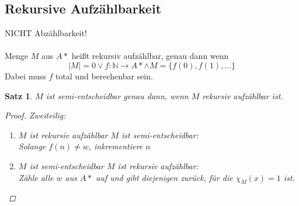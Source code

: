 \documentclass{article}
\begin{document}
\subsection{Rekursive Aufzählbarkeit}
\Rightarrow NICHT Abzählbarkeit!\\\\
Menge $M$ aus $A*$ heißt rekursiv aufzählbar, genau dann wenn
\begin{equation}
    |M|=0 \vee f:\mathbb{N}\rightarrow A* \wedge M=\{f(0), f(1),...\}
\end{equation}
Dabei muss $f$ total und berechenbar sein.\\
\newtheorem{RaSe}{Satz}
\begin{framed}
    \begin{RaSe}
        $M$ ist semi-entscheidbar genau dann, wenn $M$ rekursiv aufzählbar ist.
        \begin{proof}
            Zweiteilig:
            \begin{enumerate}
                \item $M$ ist rekursiv aufzählbar \Rightarrow $M$ ist semi-entscheidbar:\\
                      Solange $f(n) \not= w$, inkrementiere $n$
                \item $M$ ist semi-entscheidbar \Rightarrow $M$ ist rekursiv aufzählbar:\\
                      Zähle alle $w$ aus $A*$ auf und gibt diejenigen zurück, für die $\chi_M(x) = 1$ ist.
                      \qedhere
            \end{enumerate}
        \end{proof}
    \end{RaSe}
\end{framed}
\end{document}
